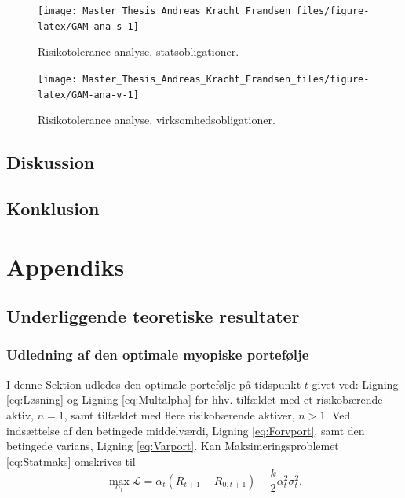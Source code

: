 \documentclass[
  a4paper,
  oneside]{memoir}
\begin{document}
\begin{figure}[H]

{\centering \texttt{[image: Master\_Thesis\_Andreas\_Kracht\_Frandsen\_files/figure-latex/GAM-ana-s-1]} 

}

\caption{Risikotolerance analyse, statsobligationer.}\label{fig:GAM-ana-s}
\end{figure}

\begin{figure}[H]

{\centering \texttt{[image: Master\_Thesis\_Andreas\_Kracht\_Frandsen\_files/figure-latex/GAM-ana-v-1]} 

}

\caption{Risikotolerance analyse, virksomhedsobligationer.}\label{fig:GAM-ana-v}
\end{figure}

\hypertarget{diskussion}{%
\chapter{Diskussion}\label{diskussion}}

\hypertarget{konklusion}{%
\chapter{Konklusion}\label{konklusion}}

\hypertarget{appendix-appendiks}{%
\appendix}


\part{Appendiks}

\hypertarget{underliggende-teoretiske-resultater}{%
\chapter{Underliggende teoretiske resultater}\label{underliggende-teoretiske-resultater}}

\hypertarget{udlmyo}{%
\section{Udledning af den optimale myopiske portefølje}\label{udlmyo}}

I denne Sektion udledes den optimale portefølje på tidspunkt \(t\) givet ved: Ligning \eqref{eq:Løsning} og Ligning \eqref{eq:Multalpha} for hhv. tilfældet med et risikobærende aktiv, \(n=1\), samt tilfældet med flere risikobærende aktiver, \(n>1\). Ved indsættelse af den betingede middelværdi, Ligning \eqref{eq:Forvport}, samt den betingede varians, Ligning \eqref{eq:Varport}. Kan Maksimeringsproblemet \eqref{eq:Statmaks} omskrives til
\[\max_{\alpha_t} \mathcal{L}=\alpha_t\left(R_{t+1} - R_{0,t+1}\right)-\frac{k}{2}\alpha_t^2\sigma_t^2.\]
\end{document}
